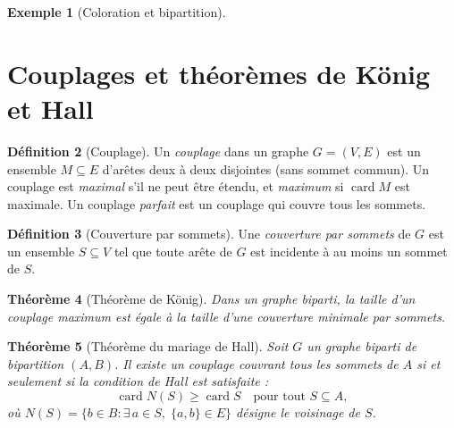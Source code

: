 \documentclass[12pt,a4paper,openany]{book}
\theoremstyle{definition}
\newtheorem{definition}{Définition}[chapter]
\newtheorem{exemple}[definition]{Exemple}
\theoremstyle{plain}
\newtheorem{theoreme}[definition]{Théorème}
\theoremstyle{remark}
\DeclareMathOperator{\card}{card}
\begin{document}
\begin{exemple}[Coloration et bipartition]
\label{ex:biparti}

\begin{center}
\end{center}
\end{exemple}

\section{Couplages et théorèmes de König et Hall}
\label{sec:couplages}

\begin{definition}[Couplage]
\label{def:couplage}
Un \emph{couplage} dans un graphe $G=(V,E)$ est un ensemble $M \subseteq E$
d'arêtes deux à deux disjointes (sans sommet commun). Un couplage est
\emph{maximal} s'il ne peut être étendu, et \emph{maximum} si $\card{M}$
est maximale. Un couplage \emph{parfait} est un couplage qui couvre tous
les sommets.
\end{definition}

\begin{definition}[Couverture par sommets]
\label{def:couverture}
Une \emph{couverture par sommets} de $G$ est un ensemble $S \subseteq V$
tel que toute arête de $G$ est incidente à au moins un sommet de $S$.
\end{definition}

\begin{theoreme}[Théorème de König]
\label{thm:konig}
Dans un graphe biparti, la taille d'un couplage maximum est égale à la
taille d'une couverture minimale par sommets.
\end{theoreme}

\begin{theoreme}[Théorème du mariage de Hall]
\label{thm:hall}
Soit $G$ un graphe biparti de bipartition $(A,B)$. Il existe un couplage
couvrant tous les sommets de $A$ si et seulement si la \emph{condition de
Hall} est satisfaite :
\[
  \card{N(S)} \geq \card{S} \quad \text{pour tout } S \subseteq A,
\]
où $N(S) = \{b \in B : \exists\, a \in S,\; \{a,b\} \in E\}$ désigne le
voisinage de $S$.
\end{theoreme}
\end{document}
